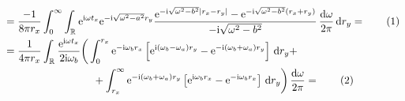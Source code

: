 \documentclass[english, parskip=full]{scrartcl}
\newcommand\numberthis{\addtocounter{equation}{1}\tag{\theequation}}
\newcommand{\intx}{}
\newcommand{\intr}{}
\newcommand{\kla}{}
\newcommand{\klam}{}
\renewcommand{\i}{\text{i}}
\newcommand{\e}{\text{e}}
\begin{document}
\begin{align*}
&= \frac{-1}{8\pi r_x} \intx\int_{0}^{\infty} \intr\int_{\mathbb{R}^{ }} \e^{\i\omega t_x} \e^{-\i \sqrt{\omega^2 - a^2} r_y} \frac{\e^{-\i \sqrt{\omega^2 - b^2} |r_x - r_y|} - \e^{-\i \sqrt{\omega^2 - b^2} (r_x + r_y)}}{-\i \sqrt{\omega^2 - b^2}} \, \frac{\mathrm{d}\omega}{2\pi} \, \mathrm{d}r_y =  \numberthis \\
 &= \frac{1}{4\pi r_x} \intr\int_{\mathbb{R}^{ }} \frac{\e^{\i\omega t_x}}{2\i\omega_b} \bigg( \int_{0}^{r_x} \e^{-\i \omega_b r_x} \klam\left[ \e^{\i (\omega_b - \omega_a) r_y} - \e^{-\i (\omega_b + \omega_a) r_y} \right] \, \mathrm{d}r_y  + \\
&\hspace{3cm} + \intx\int_{r_x}^{\infty} \e^{-\i (\omega_b + \omega_a) r_y} \klam\left[ \e^{\i\omega_b r_x} - \e^{-\i\omega_b r_x} \right] \, \mathrm{d}r_y \bigg)\, \frac{\mathrm{d}\omega}{2\pi} =  \numberthis \\

\end{align*}
\end{document}
